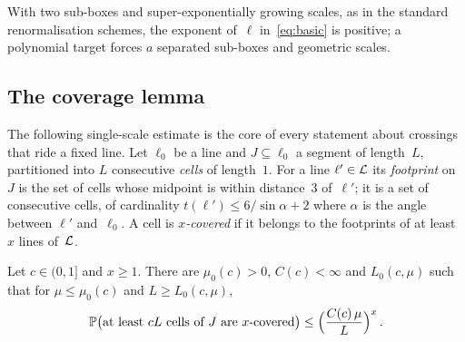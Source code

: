 \documentclass[11pt,letterpaper]{article}
\begin{document}
With two sub-boxes and super-exponentially growing scales, as in the standard renormalisation schemes, the exponent of~$\ell$ in~\eqref{eq:basic} is positive; a polynomial target forces $a$ separated sub-boxes and geometric scales.

\subsection{The coverage lemma}

The following single-scale estimate is the core of every statement about crossings that ride a fixed line. Let $\ell_0$ be a line and $J\subseteq\ell_0$ a segment of length~$L$, partitioned into $L$ consecutive \emph{cells} of length~$1$. For a line $\ell'\in\cL$ its \emph{footprint} on~$J$ is the set of cells whose midpoint is within distance~$3$ of~$\ell'$; it is a set of consecutive cells, of cardinality $t(\ell')\le6/\sin\alpha+2$ where $\alpha$ is the angle between $\ell'$ and~$\ell_0$. A cell is \emph{$x$-covered} if it belongs to the footprints of at least $x$ lines of~$\cL$.

\begin{lemma}[Coverage]
\label{lem:coverage}
Let $c\in(0,1]$ and $x\ge1$. There are $\mu_0(c)>0$, $C(c)<\infty$ and $L_0(c,\mu)$ such that for $\mu\le\mu_0(c)$ and $L\ge L_0(c,\mu)$,
\begin{equation}
\label{eq:coverage}
  \P\bigl(\text{at least }cL\text{ cells of }J\text{ are }x\text{-covered}\bigr)\le\Bigl(\frac{C(c)\,\mu}{L}\Bigr)^{x}\,.
\end{equation}
\end{lemma}
\end{document}
